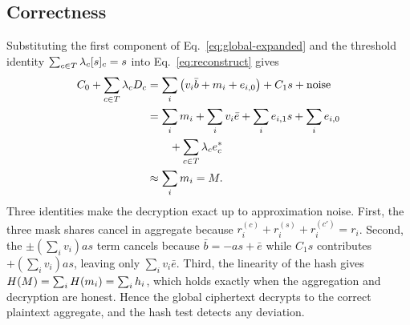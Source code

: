 \subsection{Correctness}
\label{subsec:correctness}
Substituting the first component of Eq.~\eqref{eq:global-expanded} and the threshold identity $\sum_{c\in T}\lambda_c[s]_{c}=s$ into Eq.~\eqref{eq:reconstruct} gives
\begin{equation}
  \label{eq:correctness}
  \begin{aligned}
  C_0+\sum_{c\in T}\lambda_c D_c
  &=\sum_i\big(v_i\bar b+m_i+e_{i,0}\big)+C_1 s+\text{noise}\\
  &=\sum_i m_i+\sum_i v_i\bar e+\sum_i e_{i,1}s+\sum_i e_{i,0}\\
  &\qquad+\sum_{c\in T}\lambda_c e_c^*\\
  &\approx \sum_i m_i=M .
  \end{aligned}
\end{equation}
Three identities make the decryption exact up to approximation noise. First, the three mask shares cancel in aggregate because $r_i^{(c)}+r_i^{(s)}+r_i^{(c')}=r_i$. Second, the $\pm(\sum_i v_i)as$ term cancels because $\bar b=-as+\bar e$ while $C_1s$ contributes $+(\sum_i v_i)as$, leaving only $\sum_i v_i\bar e$. Third, the linearity of the hash gives $H(M)=\sum_i H(m_i)=\sum_i h_i$, which holds exactly when the aggregation and decryption are honest. Hence the global ciphertext decrypts to the correct plaintext aggregate, and the hash test detects any deviation.
